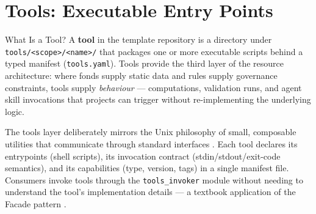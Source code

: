 \documentclass[
  ignorenonframetext,
]{beamer}
\author{\texorpdfstring{}{}}
\date{}
\begin{document}
\section{Tools: Executable Entry Points}\label{sec:tools}

\begin{frame}{What Is a Tool?}
\protect{}\label{what-is-a-tool}
A \textbf{tool} in the template repository is a directory under
\texttt{tools/\textless{}scope\textgreater{}/\textless{}name\textgreater{}/}
that packages one or more executable scripts behind a typed manifest
(\texttt{tools.yaml}). Tools provide the third layer of the resource
architecture: where fonds supply static data and rules supply governance
constraints, tools supply \emph{behaviour} --- computations, validation
runs, and agent skill invocations that projects can trigger without
re-implementing the underlying logic.

The tools layer deliberately mirrors the Unix philosophy of small,
composable utilities that communicate through standard interfaces
. Each tool declares its entrypoints (shell
scripts), its invocation contract (stdin/stdout/exit-code semantics),
and its capabilities (type, version, tags) in a single manifest file.
Consumers invoke tools through the \texttt{tools\_invoker} module
without needing to understand the tool's implementation details --- a
textbook application of the Facade pattern .
\end{frame}
\end{document}
